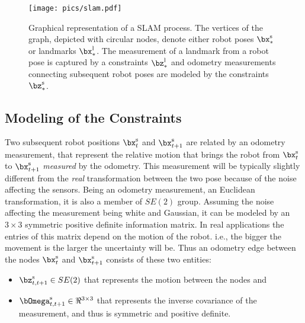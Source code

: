 \documentclass[a4paper]{article}
\begin{document}
\begin{figure}
\centering
\texttt{[image: pics/slam.pdf]}
\caption{Graphical representation of a SLAM process. The vertices of
  the graph, depicted with circular nodes, denote either robot poses
  $\bx^\mathrm{s}_*$ or landmarks $\bx^\mathrm{l}_*$. The measurement
  of a landmark from a robot pose is captured by a constraints
  $\bz^{\mathrm{l}}_*$ and odometry measurements connecting subsequent
robot poses are modeled by the constraints $\bz^\mathrm{s}_*$.}
\label{fig:slam}
\end{figure}

\subsection{Modeling of the Constraints}
Two subsequent robot positions $\bx^\mathrm{s}_t$ and
$\bx^\mathrm{s}_{t+1}$ are related by an odometry measurement, that
represent the relative motion that brings the robot from
$\bx^\mathrm{s}_t$ to $\bx^\mathrm{s}_{t+1}$ \emph{measured} by the
odometry. This measurement will be typically slightly different from
the \emph{real} transformation between the two pose because of the
noise affecting the sensors.  Being an odometry measurement, an
Euclidean transformation, it is also a member of $SE(2)$ group.
Assuming the noise affecting the measurement being white and Gaussian,
it can be modeled by an $3 \times 3$ symmetric positive definite
information matrix.  In real applications the entries of this matrix
depend on the motion of the robot.  i.e., the bigger the movement is
the larger the uncertainty will be.
Thus an odometry edge between the nodes $\bx^\mathrm{s}_t$ and
$\bx^\mathrm{s}_{t+1}$ consists of these two entities:
\begin{itemize}
\item $\bz^\mathrm{s}_{t,t+1} \in SE(2)$ that represents the motion
  between the nodes and
\item $\bOmega^\mathrm{s}_{t,t+1} \in \Re^{3 \times 3}$ that represents the
  inverse covariance of the measurement, and thus is symmetric and
  positive definite.
\end{itemize}
\end{document}
